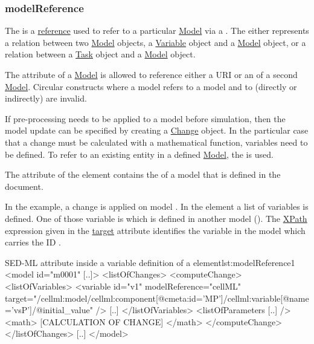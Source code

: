 \subsubsection{modelReference}
\label{sec:modelReference}
The  is a \hyperref[sec:reference]{reference} used to refer to a particular \hyperref[class:model]{Model} via a \hyperref[type:sidref]{}. The  either represents a relation between two \hyperref[class:model]{Model} objects, a \hyperref[class:variable]{Variable} object and a \hyperref[class:model]{Model} object, or a relation between a \hyperref[class:task]{Task} object and a \hyperref[class:model]{Model} object.

The \hyperref[sec:model_source]{} attribute of a \hyperref[class:model]{Model} is allowed to reference either a URI or an \hyperref[type:sid]{} of a second \hyperref[class:model]{Model}. Circular constructs where a model  refers to a model  and  to  (directly or indirectly) are invalid.

If pre-processing needs to be applied to a model before simulation, then the model update can be specified by creating a \hyperref[class:change]{Change} object. In the particular case that a change must be calculated with a mathematical function, variables need to be defined. To refer to an existing entity in a defined \hyperref[class:model]{Model}, the  is used. 

The  attribute of the  element contains the  of a model that is defined in the document. 

In the example, a change is  applied on model . In the  element a list of variables is defined. One of those variable is  which is defined in another model (). The \hyperref[sec:xpath]{XPath} expression given in the \hyperref[sec:target]{target} attribute identifies the variable in the model which carries the ID .
\begin{myXmlLst}{SED-ML  attribute inside a variable definition of a  element}{lst:modelReference1}
<model id="m0001" [..]>
	<listOfChanges>
		<computeChange>
			<listOfVariables>
				<variable id="v1" modelReference="cellML" target="/cellml:model/cellml:component[@cmeta:id='MP']/cellml:variable[@name='vsP']/@initial_value" />
     			[..]
			</listOfVariables>
			<listOfParameters [..] />
    			<math>
     			[CALCULATION OF CHANGE]
    			</math>
   		</computeChange>
	</listOfChanges>
	[..]
</model>
\end{myXmlLst}

